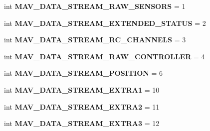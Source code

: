 \begin{DoxyCompactItemize}
\item 
\mbox{\label{namespacepymavlink_1_1dialects_1_1v10_a7d1953ff761e646db393a2af3327208c}} 
int {\bfseries M\+A\+V\+\_\+\+D\+A\+T\+A\+\_\+\+S\+T\+R\+E\+A\+M\+\_\+\+R\+A\+W\+\_\+\+S\+E\+N\+S\+O\+RS} = 1
\item 
\mbox{\label{namespacepymavlink_1_1dialects_1_1v10_a7567f9c558c6139172eb74b5dc5a4885}} 
int {\bfseries M\+A\+V\+\_\+\+D\+A\+T\+A\+\_\+\+S\+T\+R\+E\+A\+M\+\_\+\+E\+X\+T\+E\+N\+D\+E\+D\+\_\+\+S\+T\+A\+T\+US} = 2
\item 
\mbox{\label{namespacepymavlink_1_1dialects_1_1v10_a2ff4968bb6eb33e921927c1a4a3a2134}} 
int {\bfseries M\+A\+V\+\_\+\+D\+A\+T\+A\+\_\+\+S\+T\+R\+E\+A\+M\+\_\+\+R\+C\+\_\+\+C\+H\+A\+N\+N\+E\+LS} = 3
\item 
\mbox{\label{namespacepymavlink_1_1dialects_1_1v10_a895b2a92a9bb5ab205606c23d0ec6d93}} 
int {\bfseries M\+A\+V\+\_\+\+D\+A\+T\+A\+\_\+\+S\+T\+R\+E\+A\+M\+\_\+\+R\+A\+W\+\_\+\+C\+O\+N\+T\+R\+O\+L\+L\+ER} = 4
\item 
\mbox{\label{namespacepymavlink_1_1dialects_1_1v10_abfb63719368c227f9fed7acf78b1f669}} 
int {\bfseries M\+A\+V\+\_\+\+D\+A\+T\+A\+\_\+\+S\+T\+R\+E\+A\+M\+\_\+\+P\+O\+S\+I\+T\+I\+ON} = 6
\item 
\mbox{\label{namespacepymavlink_1_1dialects_1_1v10_a838d554c7bbb56bb4ac43999ba432fa2}} 
int {\bfseries M\+A\+V\+\_\+\+D\+A\+T\+A\+\_\+\+S\+T\+R\+E\+A\+M\+\_\+\+E\+X\+T\+R\+A1} = 10
\item 
\mbox{\label{namespacepymavlink_1_1dialects_1_1v10_a3e0e4480422fee65292a36346bc4a438}} 
int {\bfseries M\+A\+V\+\_\+\+D\+A\+T\+A\+\_\+\+S\+T\+R\+E\+A\+M\+\_\+\+E\+X\+T\+R\+A2} = 11
\item 
\mbox{\label{namespacepymavlink_1_1dialects_1_1v10_abc21052ed30090d463661e26976419a3}} 
int {\bfseries M\+A\+V\+\_\+\+D\+A\+T\+A\+\_\+\+S\+T\+R\+E\+A\+M\+\_\+\+E\+X\+T\+R\+A3} = 12
\item 

\end{DoxyCompactItemize}
